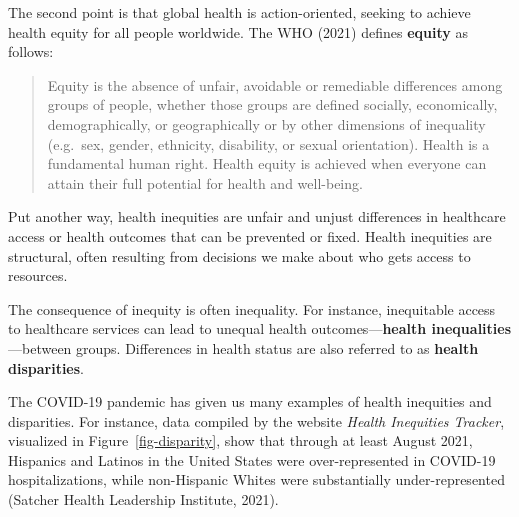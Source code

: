 \documentclass[
  letterpaper,
  DIV=11,
  numbers=noendperiod,
  oneside]{scrreprt}
\begin{document}
The second point is that global health is action-oriented, seeking to
achieve health equity for all people worldwide. The WHO
(2021)
defines \textbf{equity} as follows:

\begin{quote}
Equity is the absence of unfair, avoidable or remediable differences
among groups of people, whether those groups are defined socially,
economically, demographically, or geographically or by other dimensions
of inequality (e.g.~sex, gender, ethnicity, disability, or sexual
orientation). Health is a fundamental human right. Health equity is
achieved when everyone can attain their full potential for health and
well-being.
\end{quote}

Put another way, health inequities are unfair and unjust differences in
healthcare access or health outcomes that can be prevented or fixed.
Health inequities are structural, often resulting from decisions we make
about who gets access to resources.

The consequence of inequity is often inequality. For instance,
inequitable access to healthcare services can lead to unequal health
outcomes---\textbf{health inequalities}---between groups. Differences in
health status are also referred to as \textbf{health disparities}.

The COVID-19 pandemic has given us many examples of health inequities
and disparities. For instance, data compiled by the website \emph{Health
Inequities Tracker}, visualized in Figure~\ref{fig-disparity}, show that
through at least August 2021, Hispanics and Latinos in the United States
were over-represented in COVID-19 hospitalizations, while non-Hispanic
Whites were substantially under-represented (Satcher Health Leadership
Institute,
2021).
\end{document}
